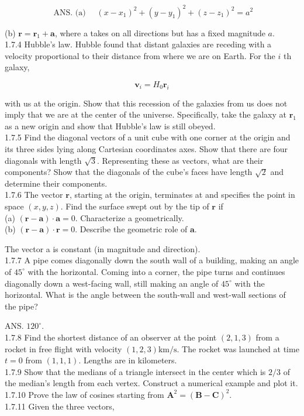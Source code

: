 \documentclass[10pt]{article}
\begin{document}
$$
\text { ANS. (a) } \quad\left(x-x_{1}\right)^{2}+\left(y-y_{1}\right)^{2}+\left(z-z_{1}\right)^{2}=a^{2}
$$

(b) $\mathbf{r}=\mathbf{r}_{1}+\mathbf{a}$, where a takes on all directions but has a fixed magnitude $a$.\\
1.7.4 Hubble's law. Hubble found that distant galaxies are receding with a velocity proportional to their distance from where we are on Earth. For the $i$ th galaxy,

$$
\mathbf{v}_{i}=H_{0} \mathbf{r}_{i}
$$

with us at the origin. Show that this recession of the galaxies from us does not imply that we are at the center of the universe. Specifically, take the galaxy at $\mathbf{r}_{1}$ as a new origin and show that Hubble's law is still obeyed.\\
1.7.5 Find the diagonal vectors of a unit cube with one corner at the origin and its three sides lying along Cartesian coordinates axes. Show that there are four diagonals with length $\sqrt{3}$. Representing these as vectors, what are their components? Show that the diagonals of the cube's faces have length $\sqrt{2}$ and determine their components.\\
1.7.6 The vector $\mathbf{r}$, starting at the origin, terminates at and specifies the point in space $(x, y, z)$. Find the surface swept out by the tip of $\mathbf{r}$ if\\
(a) $(\mathbf{r}-\mathbf{a}) \cdot \mathbf{a}=0$. Characterize a geometrically.\\
(b) $(\mathbf{r}-\mathbf{a}) \cdot \mathbf{r}=0$. Describe the geometric role of $\mathbf{a}$.

The vector a is constant (in magnitude and direction).\\
1.7.7 A pipe comes diagonally down the south wall of a building, making an angle of $45^{\circ}$ with the horizontal. Coming into a corner, the pipe turns and continues diagonally down a west-facing wall, still making an angle of $45^{\circ}$ with the horizontal. What is the angle between the south-wall and west-wall sections of the pipe?

ANS. $120^{\circ}$.\\
1.7.8 Find the shortest distance of an observer at the point $(2,1,3)$ from a rocket in free flight with velocity $(1,2,3) \mathrm{km} / \mathrm{s}$. The rocket was launched at time $t=0$ from $(1,1,1)$. Lengths are in kilometers.\\
1.7.9 Show that the medians of a triangle intersect in the center which is $2 / 3$ of the median's length from each vertex. Construct a numerical example and plot it.\\
1.7.10 Prove the law of cosines starting from $\mathbf{A}^{2}=(\mathbf{B}-\mathbf{C})^{2}$.\\
1.7.11 Given the three vectors,
\end{document}
